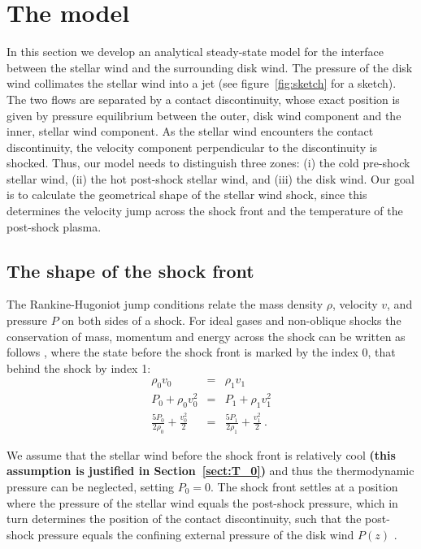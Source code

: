 \section{The model}

In this section we develop an analytical steady-state model for the interface between the stellar wind and the surrounding disk wind. The pressure of the disk wind collimates the stellar wind into a jet (see figure~\ref{fig:sketch} for a sketch). The two flows are separated by a contact discontinuity, whose exact position is given by pressure equilibrium between the outer, disk wind component and the inner, stellar wind component. As the stellar wind encounters the contact discontinuity, the velocity component perpendicular to the discontinuity is shocked. Thus, our model needs to distinguish three zones: (i) the cold pre-shock stellar wind, (ii) the hot post-shock stellar wind, and (iii) the disk wind. Our goal is to calculate the geometrical shape of the stellar wind shock, since this determines the velocity jump across the shock front and the temperature of the post-shock plasma. 

\subsection{The shape of the shock front}
\label{sect:model}
The Rankine-Hugoniot jump conditions relate the mass density $\rho$, velocity $v$, and pressure $P$ on both sides of a shock. For ideal gases and non-oblique shocks the conservation of mass, momentum and energy across the shock can be written as follows \citep[][chap.~7]{1967pswh.book.....Z}, where the state before the shock front is marked by the index 0, that behind the shock by index 1:
\begin{eqnarray}
\rho_0 v_0 & = & \rho_1 v_1 \label{eqn:RH1}\\
\label{eqn:RH2}P_0+\rho_0 v_0^2 & = & P_1+\rho_1 v_1^2\\
\label{eqn:RH3}\frac{5 P_0}{2\rho_0}+\frac{v_0^2}{2}& = &\frac{5 P_1}{2\rho_1}+\frac{v_1^2}{2} \ .
\end{eqnarray}

We assume that the stellar wind before the shock front is relatively cool \textbf{(this assumption is justified in Section~\ref{sect:T_0})} and thus the thermodynamic pressure can be neglected, setting $P_0=0$.
The shock front settles at a position where the pressure of the stellar wind equals the post-shock pressure, which in turn determines the position of the contact discontinuity, such that the post-shock pressure equals the confining external pressure of the disk wind $P(z)$ . 

